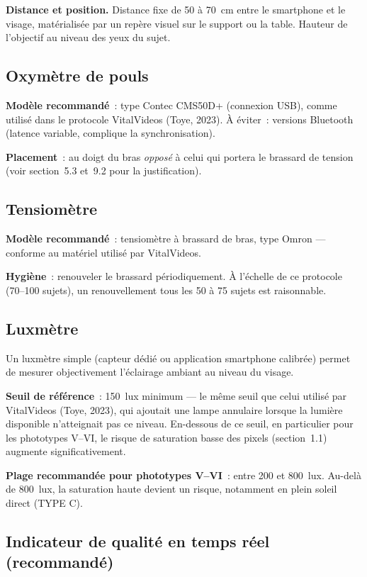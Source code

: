 \documentclass[11pt,a4paper]{article}
\begin{document}
\textbf{Distance et position.} Distance fixe de 50 \`a 70~cm entre le
smartphone et le visage, mat\'erialis\'ee par un rep\`ere visuel sur le
support ou la table. Hauteur de l'objectif au niveau des yeux du sujet.

\subsection{Oxym\`etre de pouls}

\textbf{Mod\`ele recommand\'e}~: type Contec CMS50D+ (connexion USB), comme
utilis\'e dans le protocole VitalVideos (Toye, 2023). \`A \'eviter~:
versions Bluetooth (latence variable, complique la synchronisation).

\textbf{Placement}~: au doigt du bras \emph{oppos\'e} \`a celui qui portera
le brassard de tension (voir section~5.3 et~9.2 pour la justification).

\subsection{Tensiom\`etre}

\textbf{Mod\`ele recommand\'e}~: tensiom\`etre \`a brassard de bras, type
Omron --- conforme au mat\'eriel utilis\'e par VitalVideos.

\textbf{Hygi\`ene}~: renouveler le brassard p\'eriodiquement. \`A l'\'echelle
de ce protocole (70--100 sujets), un renouvellement tous les 50 \`a 75 sujets
est raisonnable.

\subsection{Luxm\`etre}

Un luxm\`etre simple (capteur d\'edi\'e ou application smartphone calibr\'ee)
permet de mesurer objectivement l'\'eclairage ambiant au niveau du visage.

\textbf{Seuil de r\'ef\'erence}~: 150~lux minimum --- le m\^eme seuil que
celui utilis\'e par VitalVideos (Toye, 2023), qui ajoutait une lampe
annulaire lorsque la lumi\`ere disponible n'atteignait pas ce niveau.
En-dessous de ce seuil, en particulier pour les phototypes V--VI, le risque
de saturation basse des pixels (section~1.1) augmente significativement.

\textbf{Plage recommand\'ee pour phototypes V--VI}~: entre 200 et 800~lux.
Au-del\`a de 800~lux, la saturation haute devient un risque, notamment en
plein soleil direct (TYPE C).

\subsection{Indicateur de qualit\'e en temps r\'eel (recommand\'e)}
\end{document}
